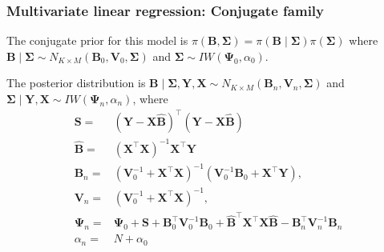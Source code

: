 \documentclass[12pt, compress]{beamer}
\begin{document}
\begin{frame}
	\frametitle{Multivariate linear regression: Conjugate family}
The conjugate prior for this model is $\pi({\bm{B}},{\bm{\Sigma}})=\pi({\bm{B}}\mid {\bm{\Sigma}})\pi({\bm{\Sigma}})$ where ${\bm{B}}\mid {\bm \Sigma}\sim N_{K\times M}({\bm{B}}_{0},{\bm{V}}_{0},{\bm{\Sigma}})$ and ${\bm{\Sigma}}\sim IW({\bm{\Psi}}_{0},\alpha_{0})$.

The posterior distribution is ${\bm{B}}\mid  {\bm \Sigma},{\bm{Y}}, {\bm{X}} \sim N_{K\times M}({\bm{B}}_n,{\bm{V}}_n,{\bm \Sigma})$ and ${\bm \Sigma}\mid  {\bm{Y}},{\bm{X}} \sim IW({\bm{\Psi}}_n,{\alpha}_n)$, where
\begin{align*}
	{\bm{S}}= & ({\bm{Y}}-{\bm{X}}\widehat{\bm{B}})^{\top}({\bm{Y}}-{\bm{X}}\widehat{\bm{B}})\\
	\widehat{\bm{B}} = & ({\bm{X}}^{\top}{\bm{X}})^{-1}{\bm{X}}^{\top}{\bm{Y}}\\
	{\bm{B}}_n = &({\bm{V}}_{0}^{-1}+{\bm{X}}^{\top}{\bm{X}})^{-1}({\bm{V}}_{0}^{-1}{\bm{B}}_{0}+{\bm{X}}^{\top}{\bm{Y}}),\\
	{\bm{V}}_n = &({\bm{V}}_{0}^{-1}+{\bm{X}}^{\top}{\bm{X}})^{-1},\\
	{\bm{\Psi}}_n= &{\bm{\Psi}}_{0}+{\bm{S}}+{\bm{B}}_{0}^{\top}{\bm{V}}_{0}^{-1}{\bm{B}}_{0}+\widehat{\bm{B}}^{\top}{\bm{X}}^{\top}{\bm{X}}\widehat{\bm{B}}-{\bm{B}}_n^{\top}{\bm{V}}_n^{-1}{\bm{B}}_n\\
	\alpha_n= & N+\alpha_{0}
\end{align*} 
\end{frame}
\end{document}
